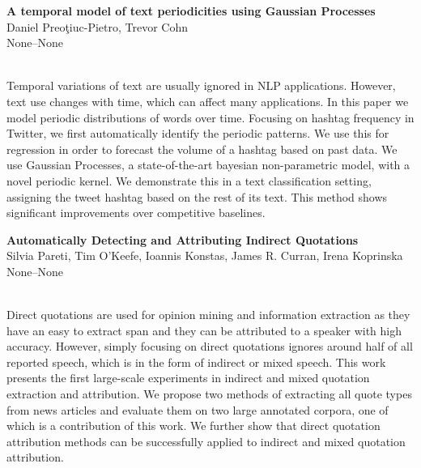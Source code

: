 \documentclass[twoside,makeidx]{book}
\renewcommand{\normalsize}{\fontsize{8}{9}\selectfont}
\renewcommand{\small}{\fontsize{7}{8}\selectfont}
\begin{document}
\par\vspace{2em}\noindent%
\begin{minipage}{\linewidth}%
\begin{center}
\textbf{\normalsize A temporal model of text periodicities using Gaussian Processes}\\
\normalsize  Daniel Preo\c{t}iuc-Pietro,  Trevor Cohn\\
{\small None--None}\\
\end{center}
\end{minipage}\\[0.5em]
\nopagebreak%
\noindent%
{\small Temporal variations of text are usually ignored in NLP applications. However, text use changes with time, which can affect many applications. In this paper we model periodic distributions of words over time. Focusing on hashtag frequency in Twitter, we first automatically identify the periodic patterns. We use this for regression in order to forecast the volume of a hashtag based on past data. We use Gaussian Processes, a state-of-the-art bayesian non-parametric model, with a novel periodic kernel. We demonstrate this in a text classification setting, assigning the tweet hashtag based on the rest of its text. This method shows significant improvements over competitive baselines.}
\par\vspace{2em}\noindent%
\begin{minipage}{\linewidth}%
\begin{center}
\textbf{\normalsize Automatically Detecting and Attributing Indirect Quotations}\\
\normalsize  Silvia Pareti,  Tim O'Keefe,  Ioannis Konstas,  James R. Curran,  Irena Koprinska\\
{\small None--None}\\
\end{center}
\end{minipage}\\[0.5em]
\nopagebreak%
\noindent%
{\small Direct quotations are used for opinion mining and information extraction as they have an easy to extract span and they can be attributed to a speaker with high accuracy. However, simply focusing on direct quotations ignores around half of all reported speech, which is in the form of indirect or mixed speech. This work presents the first large-scale experiments in indirect and mixed quotation extraction and attribution.  We propose two methods of extracting all quote types from news articles and evaluate them on two large annotated corpora, one of which is a contribution of this work. We further show that direct quotation attribution methods can be successfully applied to indirect and mixed quotation attribution.}
\end{document}
